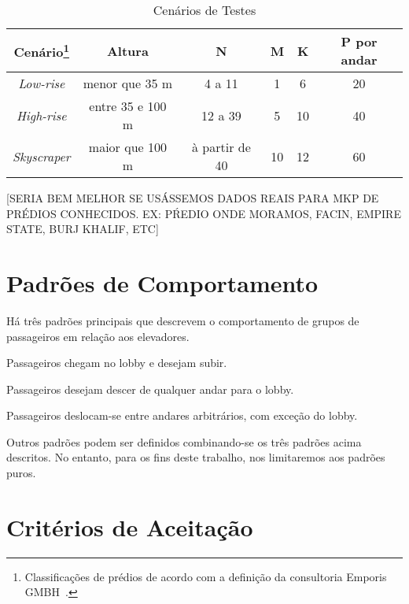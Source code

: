 \begin{savenotes}
\begin{table}[htb!]
\centering
\caption{Cenários de Testes}
\label{tab:cenarios}
\begin{tabular}{|c|c|c|c|c|c|}
\hline
{\bf Cenário\footnote{Classificações de prédios de acordo com a definição da consultoria Emporis GMBH~\cite{Emporis15}.}}    & {\bf Altura} & {\bf N}  & {\bf M}        & {\bf K} & {\bf P por andar} \\ \hline
{\it Low-rise}   & menor que 35 m          & 4 a 11         & 1       & 6       & 20      \\ \hline
{\it High-rise}  & entre 35 e 100 m        & 12 a 39        & 5       & 10      & 40      \\ \hline
{\it Skyscraper} & maior que 100 m         & à partir de 40 & 10      & 12      & 60      \\ \hline
\end{tabular}
\end{table}
\end{savenotes}

{\color{red}[SERIA BEM MELHOR SE USÁSSEMOS DADOS REAIS PARA MKP DE PRÉDIOS CONHECIDOS. EX: PŔEDIO ONDE MORAMOS, FACIN, EMPIRE STATE, BURJ KHALIF, ETC]} %

\section{Padrões de Comportamento}

Há três padrões principais que descrevem o comportamento de grupos de
passageiros em relação aos elevadores.

\begin{description}[leftmargin=!,labelwidth=\widthof{\bfseries interfloor}]
  \item[up peak]    Passageiros chegam no lobby e desejam subir.
  \item[down peak]  Passageiros desejam descer de qualquer andar para o lobby.
  \item[interfloor] Passageiros deslocam-se entre andares arbitrários, com exceção do lobby.
\end{description}

Outros padrões podem ser definidos combinando-se os três padrões acima
descritos. No entanto, para os fins deste trabalho, nos limitaremos aos padrões puros.

\section{Critérios de Aceitação}

